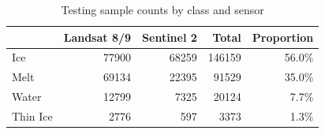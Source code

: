 \begin{table}
\caption{Testing sample counts by class and sensor}
\label{tab:training_samples}
\begin{tabular}{lrrrr}
\toprule
 & Landsat 8/9 & Sentinel 2 & Total & Proportion \\
\midrule
Ice & 77900 & 68259 & 146159 & 56.0\% \\
Melt & 69134 & 22395 & 91529 & 35.0\% \\
Water & 12799 & 7325 & 20124 & 7.7\% \\
Thin Ice & 2776 & 597 & 3373 & 1.3\% \\
\bottomrule
\end{tabular}
\end{table}
